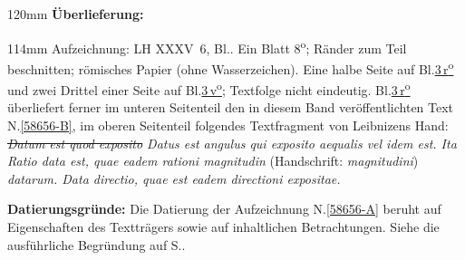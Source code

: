 %
\frenchspacing%
\begin{ledgroupsized}[r]{120mm}%
\footnotesize%
\pstart%
\noindent%
\textbf{Überlieferung:}%
\pend%
\end{ledgroupsized}%
\begin{ledgroupsized}[r]{114mm}%
\footnotesize%
\pstart%
\parindent -6mm%
%
Aufzeichnung:
LH XXXV~6, Bl..
Ein Blatt 8\textsuperscript{o};
Ränder zum Teil beschnitten;
römisches Papier %
(ohne Wasserzeichen).
Eine halbe Seite auf Bl.\;\href{\Scan{LH_35_06_23_003r}}{3\,r\textsuperscript{o}}
und zwei Drittel einer Seite auf Bl.\;\href{\Scan{LH_35_06_23_003v}}{3\,v\textsuperscript{o}};
Textfolge nicht eindeutig. %
Bl.\;\href{\Scan{LH_35_06_23_003r}}{3\,r\textsuperscript{o}} überliefert ferner im unteren Seitenteil den in diesem Band veröffentlichten Text N.\;\ref{58656-B}, %
im oberen Seitenteil folgendes Textfragment von Leibnizens Hand:
\textit{%
\sout{Datum est quod exposito}
Datus est angulus qui exposito aequalis vel idem est.
Ita Ratio data est, quae eadem rationi magnitudin}%
(Handschrift: \textit{magnitudini})
\textit{datarum.
Data directio, quae est eadem directioni expositae.}%
\pend%
\end{ledgroupsized}%
\vspace{5mm}%
\begin{ledgroup}%
\footnotesize%
\pstart%
\noindent%
\textbf{Datierungsgründe:}
Die Datierung der Aufzeichnung N.\;\ref{58656-A} beruht auf Eigenschaften des Textträgers sowie auf inhaltlichen Betrachtungen.
Siehe die ausführliche Begründung auf S.\;\pageref{58656-A_dat}.%
\pend%
\end{ledgroup}%
%
\frenchspacing%
\vspace{8mm}%
\normalsize%
\pstart%
\noindent%
%
%
